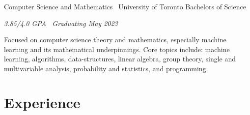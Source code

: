 \documentclass[]{style}
\begin{document}
\begin{entrylist}


\entry
{Computer Science and Mathematics \ {\normalfont University of Toronto}}
{Bachelors of Science}
{\emph{3.85/4.0 GPA \ Graduating May 2023}
~ \vspace{1mm}

Focused on computer science theory and mathematics, especially machine learning and its mathematical underpinnings.  Core topics include: machine learning, algorithms, data-structures, linear algebra, group theory, single and multivariable analysis, probability and statistics, and programming.}


\end{entrylist}


\section{Experience}
\end{document}
